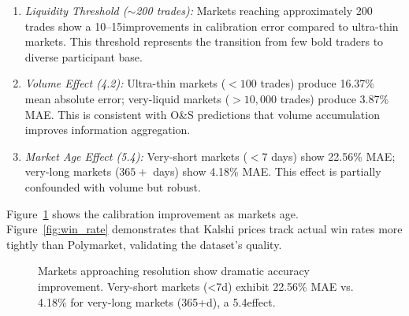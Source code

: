 \documentclass[a4paper,11pt]{article}
\theoremstyle{plain}
\theoremstyle{definition}
\begin{document}
\begin{enumerate}
\item \textit{Liquidity Threshold ($\sim$200 trades):} Markets reaching approximately 200 trades show a 10--15\times improvements in calibration error compared to ultra-thin markets. This threshold represents the transition from few bold traders to diverse participant base.

\item \textit{Volume Effect (4.2\times):} Ultra-thin markets ($<100$ trades) produce 16.37\% mean absolute error; very-liquid markets ($>10,000$ trades) produce 3.87\% MAE. This is consistent with O&S predictions that volume accumulation improves information aggregation.

\item \textit{Market Age Effect (5.4\times):} Very-short markets ($<7$ days) show 22.56\% MAE; very-long markets ($365+$ days) show 4.18\% MAE. This effect is partially confounded with volume but robust.
\end{enumerate}

Figure~\ref{fig:calibration_by_age} shows the calibration improvement as markets age. Figure~\ref{fig:win_rate} demonstrates that Kalshi prices track actual win rates more tightly than Polymarket, validating the dataset's quality.

\begin{figure}[h]
\centering
\small
{}
\caption{Markets approaching resolution show dramatic accuracy improvement. Very-short markets (<7d) exhibit 22.56\% MAE vs. 4.18\% for very-long markets (365+d), a 5.4\times effect.}
\label{fig:calibration_by_age}
\end{figure}
\end{document}
